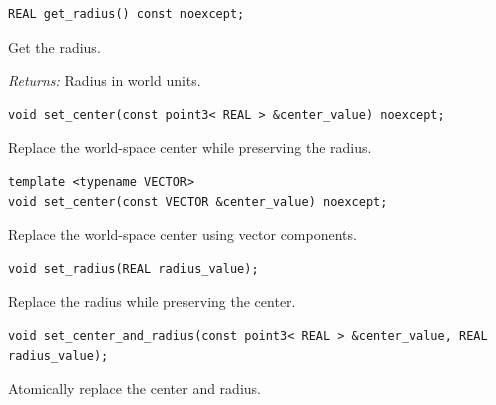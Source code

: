 \par\noindent\begin{minipage}{\linewidth}
\begin{lstlisting}[style=apireference]
REAL get_radius() const noexcept;
\end{lstlisting}
{\footnotesize Get the radius.\par}
{\footnotesize\textit{Returns:} Radius in world units.\par}
\end{minipage}\par\vspace{1pt}
\par\noindent\begin{minipage}{\linewidth}
\begin{lstlisting}[style=apireference]
void set_center(const point3< REAL > &center_value) noexcept;
\end{lstlisting}
{\footnotesize Replace the world-space center while preserving the radius.\par}
\end{minipage}\par\vspace{1pt}
\par\noindent\begin{minipage}{\linewidth}
\begin{lstlisting}[style=apireference]
template <typename VECTOR>
void set_center(const VECTOR &center_value) noexcept;
\end{lstlisting}
{\footnotesize Replace the world-space center using vector components.\par}
\end{minipage}\par\vspace{1pt}
\par\noindent\begin{minipage}{\linewidth}
\begin{lstlisting}[style=apireference]
void set_radius(REAL radius_value);
\end{lstlisting}
{\footnotesize Replace the radius while preserving the center.\par}
\end{minipage}\par\vspace{1pt}
\par\noindent\begin{minipage}{\linewidth}
\begin{lstlisting}[style=apireference]
void set_center_and_radius(const point3< REAL > &center_value, REAL radius_value);
\end{lstlisting}
{\footnotesize Atomically replace the center and radius.\par}
\end{minipage}\par\vspace{1pt}
